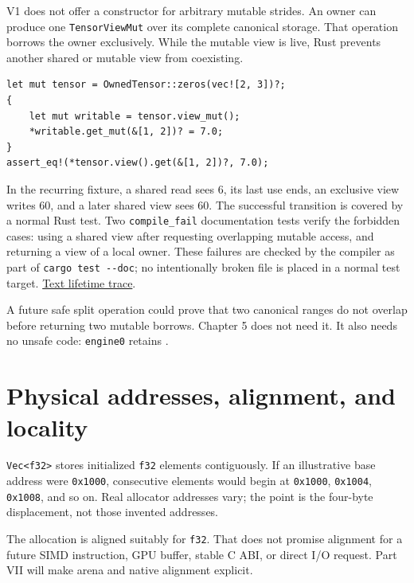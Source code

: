 V1 does not offer a constructor for arbitrary mutable strides. An owner
can produce one \texttt{TensorViewMut} over its complete canonical
storage. That operation borrows the owner exclusively. While the mutable
view is live, Rust prevents another shared or mutable view from
coexisting.

\begin{verbatim}
let mut tensor = OwnedTensor::zeros(vec![2, 3])?;
{
    let mut writable = tensor.view_mut();
    *writable.get_mut(&[1, 2])? = 7.0;
}
assert_eq!(*tensor.view().get(&[1, 2])?, 7.0);
\end{verbatim}


In the recurring fixture, a shared read sees 6, its last use ends, an
exclusive view writes 60, and a later shared view sees 60. The
successful transition is covered by a normal Rust test. Two
\texttt{compile\_fail} documentation tests verify the forbidden cases:
using a shared view after requesting overlapping mutable access, and
returning a view of a local owner. These failures are checked by the
compiler as part of \texttt{cargo\ test\ -\/-doc}; no intentionally
broken file is placed in a normal test target.
\href{https://github.com/hermonai/inside-the-llm-engine/blob/astra-visual-rewrite/figures/generated/tensor-lifetime.txt}{Text
lifetime trace}.

A future safe split operation could prove that two canonical ranges do
not overlap before returning two mutable borrows. Chapter 5 does not
need it. It also needs no unsafe code: \texttt{engine0} retains
\texttt{}.

\section{Physical addresses, alignment, and
locality}\label{physical-addresses-alignment-and-locality}

\texttt{Vec\textless{}f32\textgreater{}} stores initialized \texttt{f32}
elements contiguously. If an illustrative base address were
\texttt{0x1000}, consecutive elements would begin at \texttt{0x1000},
\texttt{0x1004}, \texttt{0x1008}, and so on. Real allocator addresses
vary; the point is the four-byte displacement, not those invented
addresses.

The allocation is aligned suitably for \texttt{f32}. That does not
promise alignment for a future SIMD instruction, GPU buffer, stable C
ABI, or direct I/O request. Part VII will make arena and native
alignment explicit.


